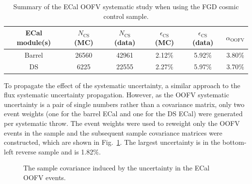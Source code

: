 \begin{table}
  \begin{tabular}{ c c c c c c }
    ECal module(s) & $N_{\textrm{CS}}$ (MC) & $N_{\textrm{CS}}$ (data) & $\epsilon_{\textrm{CS}}$ (MC) & $\epsilon_{\textrm{CS}}$ (data) & $\alpha_{\textrm{OOFV}}$ \\ \hline \hline
    Barrel & 26560 & 42961 & 2.12$\%$ & 5.92$\%$ & 3.80$\%$ \\
    DS & 6225 & 22555 & 2.27$\%$ & 5.97$\%$ & 3.70$\%$ \\
  \end{tabular}
  \caption{Summary of the ECal OOFV systematic study when using the FGD cosmic control sample.}
  \label{table:OOFVSystematicSummary}
\end{table}
\newline
\newline
To propagate the effect of the systematic uncertainty, a similar approach to the flux systematic uncertainty propagation.  However, as the OOFV systematic uncertainty is a pair of single numbers rather than a covariance matrix, only two event weights (one for the barrel ECal and one for the DS ECal) were generated per systematic throw.  The event weights were used to reweight only the OOFV events in the sample and the subsequent sample covariance matrices were constructed, which are shown in Fig.~\ref{fig:ECalOOFVCovarianceMatrices}.  The largest uncertainty is in the bottom-left reverse sample and is 1.82$\%$.
\begin{figure}[t!]
  \centering
  \caption{The sample covariance induced by the uncertainty in the ECal OOFV events.}
  \label{fig:ECalOOFVCovarianceMatrices}
\end{figure}
